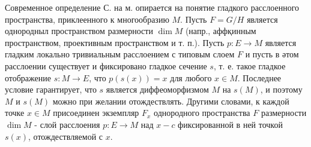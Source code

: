 \documentclass[10pt]{article}
\begin{document}
Современное определение С. на м. опирается на понятие гладкого расслоенного пространства, приклеенного к многообразию $M$. Пусть $F=G / H$ является однородныл пространством размерности $\operatorname{dim} M$ (напр., аффқинным пространством, проективным пространством и т. п.). Пусть $p: E \rightarrow M$ является гладким локально тривиальным расслоением с типовым слоем $F$ и пусть в әтом расслоении существует и фиксировано гладкое сечение $s$, т. е. такое гладкое отображение $s: M \rightarrow E$, что $p(s(x))=x$ для любого $x \in M$. Последнее условие гарантирует, что $s$ является диффеоморфизмом $M$ на $s(M)$, и поэтому $M$ и $s(M)$ можно при желании отождествлять. Другими словами, к каждой точке $x \in M$ присоединен экземпляр $F_{x}$ однородного пространства $F$ размерности $\operatorname{dim} M$ - слой расслоения $p: E \rightarrow M$ над $x-c$ фиксированной в ней точкой $s(x)$, отождествляемой с $x$.
\end{document}
